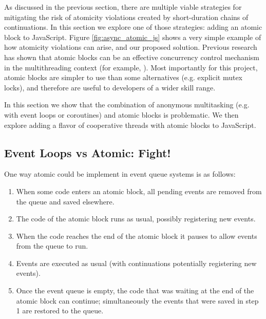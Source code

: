 \documentclass[acmsmall,anonymous,review]{acmart}\settopmatter{printfolios=true,printccs=false,printacmref=false}
\begin{document}
As discussed in the previous section, there are multiple viable strategies for mitigating the risk of atomicity violations created by short-duration chains of continuations.
In this section we explore one of those strategies: adding an atomic block to JavaScript.
Figure \ref{fig:async_atomic_js} shows a very simple example of how atomicity violations can arise, and our proposed solution.
Previous research has shown that atomic blocks can be an effective concurrency control mechanism in the multithreading context (for example, \cite{Harris2005, Grossman2007, Pankratius2014}).
Most importantly for this project, atomic blocks are simpler to use than some alternatives (e.g. explicit mutex locks), and therefore are useful to developers of a wider skill range\footnotemark{}.


In this section we show that the combination of anonymous multitasking (e.g. with event loops or coroutines) and atomic blocks is problematic.
We then explore adding a flavor of cooperative threads with atomic blocks to JavaScript.

\subsection{Event Loops vs Atomic: Fight!}

One way atomic could be implement in event queue systems is as follows:

\begin{enumerate}
\item When some code enters an atomic block, all pending events are removed from the queue and saved elsewhere.
\item The code of the atomic block runs as usual, possibly registering new events.
\item When the code reaches the end of the atomic block it pauses to allow events from the queue to run.
\item Events are executed as usual (with continuations potentially registering new events).
\item Once the event queue is empty, the code that was waiting at the end of the atomic block can continue; simultaneously the events that were saved in step 1 are restored to the queue.
\end{enumerate}
\end{document}
